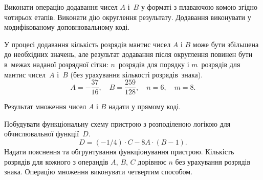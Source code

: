 \documentclass[a4paper,oneside,DIV=12,12pt]{scrartcl}
\begin{document}
	\begin{exercise}
		Виконати операцію додавання чисел $A$ і~$B$ у форматі з плаваючою комою згідно чотирьох етапів. Виконати дію округлення результату. Додавання виконувати у модифікованому доповнювальному коді.
		
		У процесі додавання кількість розрядів мантис чисел $A$ і $B$ може бути збільшена до необхідних значень, але результат додавання після округлення повинен бути в~межах наданої розрядної сітки: $n$~розрядів для порядку і $m$~розрядів для мантис чисел~$A$ і~$B$ (без урахування кількості розрядів~знака).
		\[
			A = -\frac{37}{16}, \quad
			B = \frac{259}{128}, \quad
			n = 6, \quad
			m = 8.
		\]
		
		Результат множення чисел $A$ і $B$ надати у прямому коді. 
	\end{exercise}
	
	\begin{exercise}
		Побудувати функціональну схему пристрою з розподіленою логікою для обчислювальної функції~$D$.
		\[
			D = (-1 / 4) \cdot C - 8A \cdot (B - 1).
		\]
		Надати пояснення та обгрунтування функціонування пристрою. Кількість розрядів для кожного з операндів $A$, $B$, $C$ дорівнює $n$ без урахування розрядів знака. Операцію множення виконувати четвертим способом.
	\end{exercise}
\end{document}
